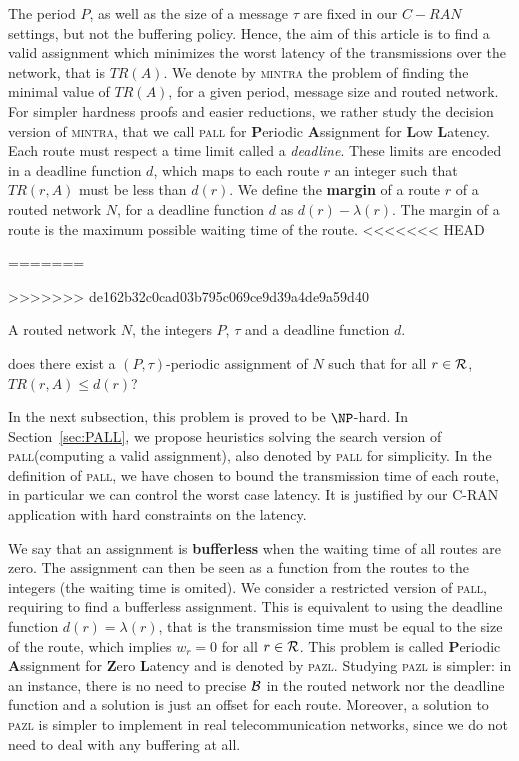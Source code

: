 \documentclass[a4paper,10pt]{article}
\newcommand\pazl{\textsc{pazl}\xspace}
\newcommand\pall{\textsc{pall}\xspace}
\newcommand\pra{\textsc{pra}\xspace}
\newcommand\mintra{\textsc{mintra}\xspace}
\begin{document}
      	The period $P$, as well as the size of a message $\tau$ are fixed in our $C-RAN$ settings, but not the buffering policy. Hence, the aim of this article is to find a valid assignment which minimizes the worst latency of the transmissions over the network, that is $TR(A)$. We denote by \mintra the problem of finding the minimal value of $TR(A)$, for a given period, message size and routed network.
      	For simpler hardness proofs and easier reductions, we rather study the decision version of \mintra, that we call \pall for \textbf{P}eriodic \textbf{A}ssignment for \textbf{L}ow \textbf{L}atency. Each route must respect a time limit called a \emph{deadline}. These limits are encoded in a deadline function $d$, which maps to each route $r$ an integer such that $TR(r,A)$ must be less than $d(r)$.
      	We define the \textbf{margin} of a route $r$ of a routed network $N$, for a deadline function $d$ as 
        $ d(r) - \lambda(r)$. The margin of a route is the maximum possible waiting time of the route.
<<<<<<< HEAD
         
=======
          
>>>>>>> de162b32c0cad03b795c069ce9d39a4de9a59d40
     

        A routed network $N$, the integers $P$, $\tau$ and a deadline function $d$.
      
       does there exist a $(P,\tau)$-periodic assignment of $N$ such that for all $r \in {\cal R}$, $TR(r,A) \leq d(r)$?

	  In the next subsection, this problem is proved to be $\NP$-hard. In Section~\ref{sec:PALL}, we propose heuristics solving the search version of \pall (computing a valid assignment), also denoted by \pall for simplicity. In the definition of \pall, we have chosen to bound the transmission time of each route, in particular we can control the worst case latency. It is justified by our C-RAN application with hard constraints on the latency. 

	 We say that an assignment is \textbf{bufferless} when the waiting time of all routes are zero.
	 The assignment can then be seen as a function from the routes to the integers (the waiting time is omited). We consider a restricted version of \pall, requiring to find a bufferless assignment. This is equivalent to using the deadline function $d(r) = \lambda(r)$, that is the 
     transmission time must be equal to the size of the route, which implies $w_r = 0$ for all $r \in \cal{R}$. This problem is called \textbf{P}eriodic \textbf{A}ssignment for \textbf{Z}ero \textbf{L}atency and is denoted by \pazl. Studying \pazl is simpler: in an instance, there is no need to precise $\cal{B}$ in the routed network nor the deadline function and a solution is just an offset for each route.  Moreover, a solution to \pazl is simpler to implement in real telecommunication networks, since we do not need to deal with any buffering at all.
\end{document}
